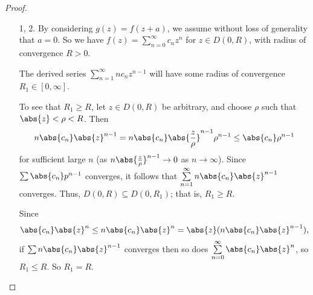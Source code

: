 \begin{proof}
    \begin{enumerate}
        \item[1, 2.] By considering \(g(z) = f(z+a)\), we assume without loss of generality that \(a = 0\). So we have \(f(z) = \sum\limits_{n=0}^{\infty} c_{n}z^n\) for \(z \in D(0,R)\), with radius of convergence \(R > 0\).

        The derived series \(\sum\limits_{n=1}^{\infty} nc_n z^{n-1}\) will have some radius of convergence \(R_1 \in [0,\infty]\).

        To see that \(R_1 \geq  R\), let \(z \in D(0,R)\) be arbitrary, and choose \(\rho\) such that \(\abs{z} <\rho<R\). Then
        \[
            n\abs{c_n} \abs{z} ^{n-1}=n\abs{c_n} \abs{\frac{z}{\rho}}^{n-1}\rho^{n-1}\leq \abs{c_n} \rho^{n-1}
        \]
        for sufficient large \(n\) (as \(n\abs{\frac{z}{\rho}}^{n-1}\to 0 \) as \(n \to \infty\)). Since \(\sum \abs{c_n} p^{n-1}\) converges, it follows that \(\sum\limits_{n=1}^{\infty} n\abs{c_n} \abs{z} ^{n-1}\) converges. Thus, \(D(0,R) \subseteq D(0,R_1)\); that is, \(R_1 \geq R\).

        Since
        \[
            \abs{c_n} \abs{z} ^n\leq n \abs{c_n} \abs{z} ^n = \abs{z} (n\abs{c_n} \abs{z} ^{n-1}),
        \]
        if \(\sum n \abs{c_n} \abs{z} ^{n-1}\) converges then so does \(\sum\limits_{n=0}^{\infty} \abs{c_n} \abs{z} ^n\), so \(R_1\leq R\). So \(R_1 = R\).


\end{enumerate}
\end{proof}
